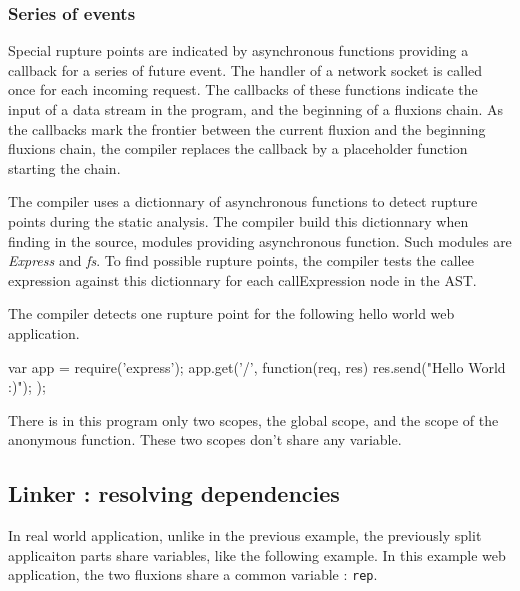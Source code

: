 \subsubsection{Series of events} \label{sss:start}

Special rupture points are indicated by asynchronous functions providing a callback for a series of future event.
The handler of a network socket is called once for each incoming request.
The callbacks of these functions indicate the input of a data stream in the program, and the beginning of a fluxions chain.
As the callbacks mark the frontier between the current fluxion and the beginning fluxions chain, the compiler replaces the callback by a placeholder function starting the chain.

The compiler uses a dictionnary of asynchronous functions to detect rupture points during the static analysis.
The compiler build this dictionnary when finding in the source, modules providing asynchronous function.
Such modules are \textit{Express} and \textit{fs}.
To find possible rupture points, the compiler tests the callee expression against this dictionnary for each callExpression node in the AST.

The compiler detects one rupture point for the following hello world web application. 

\begin{code}[Javascript, caption={Hello World},label={lst:hello}]
var app = require('express');
app.get('/', function(req, res) {
  res.send("Hello World :)");
});
\end{code}


There is in this program only two scopes, the global scope, and the scope of the anonymous function.
These two scopes don't share any variable.

\subsection{Linker : resolving dependencies} \label{ss:linker}

In real world application, unlike in the previous example, the previously split applicaiton parts share variables, like the following example.
In this example web application, the two fluxions share a common variable : \texttt{rep}.

